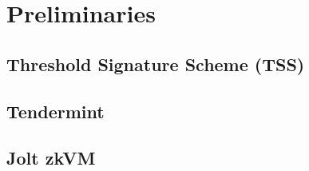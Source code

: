 

\section{Preliminaries}


\subsection{Threshold Signature Scheme (TSS)}

\subsection{Tendermint}

\subsection{Jolt zkVM}

